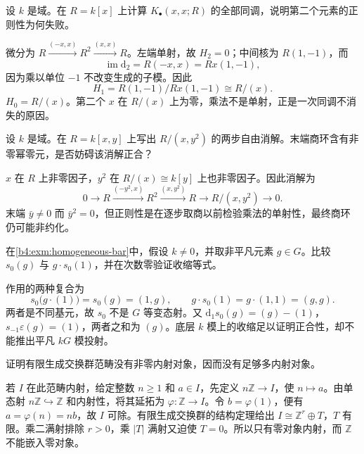 \begin{exercise}\label{b4:ex:07-koszul-repeat}
	设 \(k\) 是域。在 \(R=k[x]\) 上计算 \(K_\bullet(x,x;R)\) 的全部同调，说明第二个元素的正则性为何失败。
\end{exercise}
\begin{solution}
	微分为 \(R\xrightarrow{(-x,x)}R^2\xrightarrow{(x,x)}R\)。左端单射，故 \(H_2=0\)；中间核为 \(R(1,-1)\)，而
	\[
		\operatorname{im}\mathrm{d}_2=R(-x,x)=Rx(1,-1),
	\]
	因为乘以单位 \(-1\) 不改变生成的子模。因此
	\[
		H_1=R(1,-1)/Rx(1,-1)\cong R/(x). \]\(H_0=R/(x)\)。第二个 \(x\) 在 \(R/(x)\) 上为零，乘法不是单射，正是一次同调不消失的原因。
\end{solution}

\begin{exercise}\label{b4:ex:07-koszul-nonreduced}
	设 \(k\) 是域。在 \(R=k[x,y]\) 上写出 \(R/(x,y^2)\) 的两步自由消解。末端商环含有非零幂零元，是否妨碍该消解正合？
\end{exercise}
\begin{solution}
	\(x\) 在 \(R\) 上非零因子，\(y^2\) 在 \(R/(x)\cong k[y]\) 上也非零因子。因此消解为
	\[
		0\to R\xrightarrow{(-y^2,x)}R^2\xrightarrow{(x,y^2)}R\to R/(x,y^2)\to0.
	\]
	末端 \(\bar y\ne0\) 而 \(\bar y^2=0\)，但正则性是在逐步取商以前检验乘法的单射性，最终商环仍可能非约化。
\end{solution}

\begin{exercise}\label{b4:ex:07-bar-contraction-equivariance}
	在\cref{b4:exm:homogeneous-bar}中，假设 \(k\ne0\)，并取非平凡元素 \(g\in G\)。比较 \(s_0(g)\) 与 \(g\cdot s_0(1)\)，并在次数零验证收缩等式。
\end{exercise}
\begin{solution}
	作用的两种复合为
	\[
		s_0\bigl(g\cdot(1)\bigr)=s_0(g)=(1,g), \qquad g\cdot s_0(1)=g\cdot(1,1)=(g,g).
	\]
	两者是不同基元，故 \(s_0\) 不是 \(G\) 等变态射。又 \(\mathrm{d}_1s_0(g)=(g)-(1)\)，\(s_{-1}\varepsilon(g)=(1)\)，两者之和为 \((g)\)。底层 \(k\) 模上的收缩足以证明正合性，却不能推出平凡 \(kG\) 模投射。
\end{solution}

\begin{exercise}\label{b4:ex:07-finitely-generated-no-injectives}
	证明有限生成交换群范畴没有非零内射对象，因而没有足够多内射对象。
\end{exercise}
\begin{solution}
	若 \(I\) 在此范畴内射，给定整数 \(n\ge1\) 和 \(a\in I\)，先定义 \(n\mathbb Z\to I\)，使 \(n\mapsto a\)。由单态射 \(n\mathbb Z\hookrightarrow\mathbb Z\) 和内射性，将其延拓为 \(\varphi:\mathbb Z\to I\)。令 \(b=\varphi(1)\)，便有 \(a=\varphi(n)=nb\)，故 \(I\) 可除。有限生成交换群的结构定理给出 \(I\cong\mathbb Z^r\oplus T\)，\(T\) 有限。乘二满射排除 \(r>0\)，乘 \(|T|\) 满射又迫使 \(T=0\)。所以只有零对象内射，而 \(\mathbb Z\) 不能嵌入零对象。
\end{solution}

